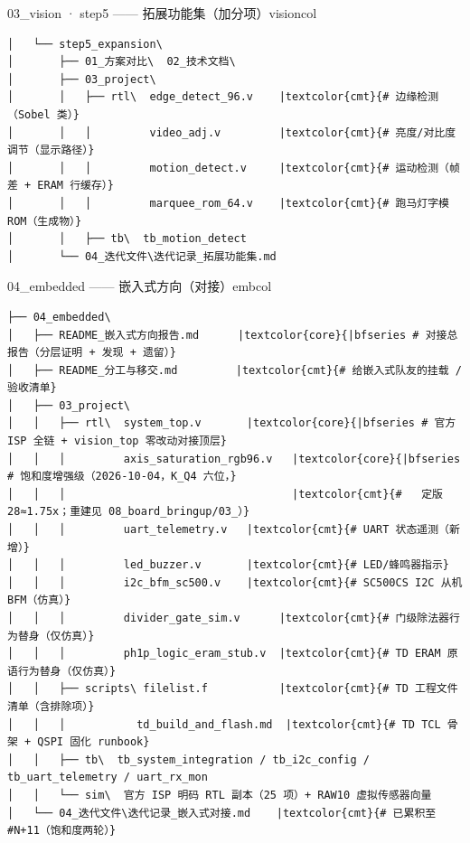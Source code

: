 \documentclass[10pt]{ctexart}
\begin{document}
\vspace{2.2mm}
\begin{sectbox}{03\_vision · step5 —— 拓展功能集（加分项）}{visioncol}
\begin{Verbatim}[fontsize=\scriptsize, commandchars=\|\{\}]
│   └── step5_expansion\
│       ├── 01_方案对比\  02_技术文档\
│       ├── 03_project\
│       │   ├── rtl\  edge_detect_96.v    |textcolor{cmt}{# 边缘检测（Sobel 类）}
│       │   │         video_adj.v         |textcolor{cmt}{# 亮度/对比度调节（显示路径）}
│       │   │         motion_detect.v     |textcolor{cmt}{# 运动检测（帧差 + ERAM 行缓存）}
│       │   │         marquee_rom_64.v    |textcolor{cmt}{# 跑马灯字模 ROM（生成物）}
│       │   ├── tb\  tb_motion_detect
│       └── 04_迭代文件\迭代记录_拓展功能集.md
\end{Verbatim}
\end{sectbox}
\vspace{2.2mm}
\begin{sectbox}{04\_embedded —— 嵌入式方向（对接）}{embcol}
\begin{Verbatim}[fontsize=\scriptsize, commandchars=\|\{\}]
├── 04_embedded\
│   ├── README_嵌入式方向报告.md      |textcolor{core}{|bfseries # 对接总报告（分层证明 + 发现 + 遗留）}
│   ├── README_分工与移交.md         |textcolor{cmt}{# 给嵌入式队友的挂载 / 验收清单}
│   ├── 03_project\
│   │   ├── rtl\  system_top.v       |textcolor{core}{|bfseries # 官方 ISP 全链 + vision_top 零改动对接顶层}
│   │   │         axis_saturation_rgb96.v   |textcolor{core}{|bfseries # 饱和度增强级（2026-10-04，K_Q4 六位，}
│   │   │                                   |textcolor{cmt}{#   定版 28≈1.75x；重建见 08_board_bringup/03_）}
│   │   │         uart_telemetry.v   |textcolor{cmt}{# UART 状态遥测（新增）}
│   │   │         led_buzzer.v       |textcolor{cmt}{# LED/蜂鸣器指示}
│   │   │         i2c_bfm_sc500.v    |textcolor{cmt}{# SC500CS I2C 从机 BFM（仿真）}
│   │   │         divider_gate_sim.v      |textcolor{cmt}{# 门级除法器行为替身（仅仿真）}
│   │   │         ph1p_logic_eram_stub.v  |textcolor{cmt}{# TD ERAM 原语行为替身（仅仿真）}
│   │   ├── scripts\ filelist.f           |textcolor{cmt}{# TD 工程文件清单（含排除项）}
│   │   │           td_build_and_flash.md  |textcolor{cmt}{# TD TCL 骨架 + QSPI 固化 runbook}
│   │   ├── tb\  tb_system_integration / tb_i2c_config / tb_uart_telemetry / uart_rx_mon
│   │   └── sim\  官方 ISP 明码 RTL 副本（25 项）+ RAW10 虚拟传感器向量
│   └── 04_迭代文件\迭代记录_嵌入式对接.md    |textcolor{cmt}{# 已累积至 #N+11（饱和度两轮）}
\end{Verbatim}
\end{sectbox}
\end{document}
